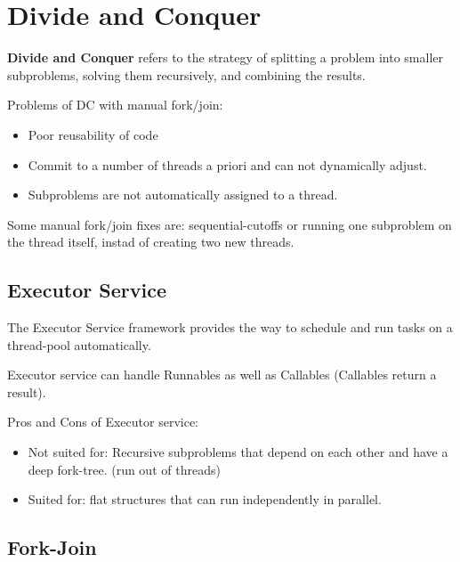 \section{Divide and Conquer}

\begin{definition}

\textbf{Divide and Conquer } refers to the strategy of splitting a problem into smaller subproblems,
                solving them recursively, and combining the results.
            
\end{definition}

Problems of DC with manual fork/join:
\begin{itemize}
    \item Poor reusability of code
    \item Commit to a number of threads a priori and can not dynamically adjust.
    \item Subproblems are not automatically assigned to a thread.
\end{itemize}


\begin{remark}
Some manual fork/join fixes are: sequential-cutoffs or running one
subproblem on the thread itself, instad of creating two new threads.
\end{remark}

\subsection{Executor Service}

The Executor Service framework provides the way to schedule and run tasks on a thread-pool automatically.

\begin{remark}
Executor service can handle Runnables as well as Callables (Callables return a result).
\end{remark}

Pros and Cons of Executor service:
\begin{itemize}
    \item Not suited for: Recursive subproblems that depend on each other and have a deep fork-tree. (run out of threads)
    \item Suited for: flat structures that can run independently in parallel.
\end{itemize}

\subsection{Fork-Join}

